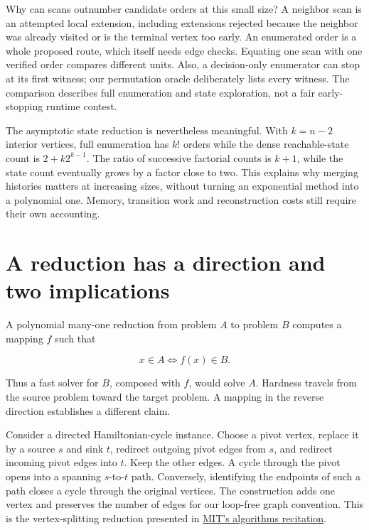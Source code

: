 
Why can scans outnumber candidate orders at this small size? A neighbor
scan is an attempted local extension, including extensions rejected
because the neighbor was already visited or is the terminal vertex too
early. An enumerated order is a whole proposed route, which itself needs
edge checks. Equating one scan with one verified order compares
different units. Also, a decision-only enumerator can stop at its first
witness; our permutation oracle deliberately lists every witness. The
comparison describes full enumeration and state exploration, not a fair
early-stopping runtime contest.

The asymptotic state reduction is nevertheless meaningful. With
\(k=n-2\) interior vertices, full enumeration has \(k!\) orders while
the dense reachable-state count is \(2+k2^{k-1}\). The ratio of
successive factorial counts is \(k+1\), while the state count eventually
grows by a factor close to two. This explains why merging histories
matters at increasing sizes, without turning an exponential method into
a polynomial one. Memory, transition work and reconstruction costs still
require their own accounting.

\section{A reduction has a direction and two
implications}\label{a-reduction-has-a-direction-and-two-implications}

A polynomial many-one reduction from problem \(A\) to problem \(B\)
computes a mapping \(f\) such that

\begin{equation}
x\in A\iff f(x)\in B.
\end{equation}

Thus a fast solver for \(B\), composed with \(f\), would solve \(A\).
Hardness travels from the source problem toward the target problem. A
mapping in the reverse direction establishes a different claim.

Consider a directed Hamiltonian-cycle instance. Choose a pivot vertex,
replace it by a source \(s\) and sink \(t\), redirect outgoing pivot
edges from \(s\), and redirect incoming pivot edges into \(t\). Keep the
other edges. A cycle through the pivot opens into a spanning
\(s\)-to-\(t\) path. Conversely, identifying the endpoints of such a
path closes a cycle through the original vertices. The construction adds
one vertex and preserves the number of edges for our loop-free graph
convention. This is the vertex-splitting reduction presented in
\href{https://ocw.mit.edu/courses/6-046j-design-and-analysis-of-algorithms-spring-2015/1dee182d301235b901119a0ff57f05e2_MIT6_046JS15_Recitation8.pdf}{MIT's
algorithms recitation}.

